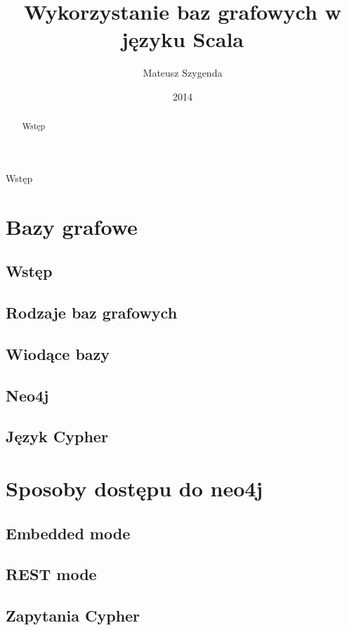 \documentclass[brudnopis]{xmgr}
\author   {Mateusz Szygenda}
\title    {Wykorzystanie baz grafowych w języku Scala}
\date     {2014}
\begin{document}
\begin{abstract}
Wstęp
\end{abstract}

\maketitle

%
\introduction
Wstęp

\chapter{Bazy grafowe}

\section{Wstęp}

\section{Rodzaje baz grafowych}

\section{Wiodące bazy}

\section{Neo4j}

\section{Język Cypher}

\chapter{Sposoby dostępu do neo4j}

\section{Embedded mode}

\section{REST mode}

\section{Zapytania Cypher}
\end{document}
